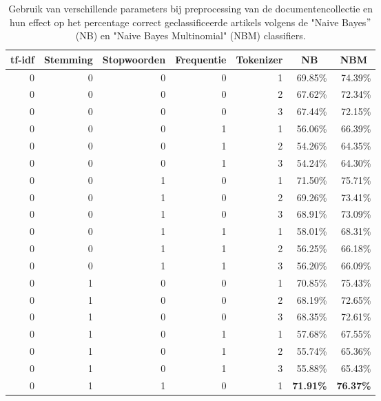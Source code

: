 \newpage
\begin{longtable}{rrrrrrr}
	\caption{Gebruik van verschillende parameters bij preprocessing van de documentencollectie en hun effect op het percentage correct geclassificeerde artikels volgens de "Naive Bayes$"$ (NB) en "Naive Bayes Multinomial" (NBM) classifiers.}\\
	\toprule
	\multicolumn{1}{c}{\textbf{tf-idf}} & \multicolumn{1}{c}{\textbf{Stemming}} & \multicolumn{1}{c}{\textbf{Stopwoorden}} & \multicolumn{1}{c}{\textbf{Frequentie}} & \multicolumn{1}{c}{\textbf{Tokenizer}} & \multicolumn{1}{c}{\textbf{NB}} & \multicolumn{1}{c}{\textbf{NBM}} \\
	\midrule
	0     & 0     & 0     & 0     & 1     & 69.85\% & 74.39\% \\
	0     & 0     & 0     & 0     & 2     & 67.62\% & 72.34\% \\
	0     & 0     & 0     & 0     & 3     & 67.44\% & 72.15\% \\
	0     & 0     & 0     & 1     & 1     & 56.06\% & 66.39\% \\
	0     & 0     & 0     & 1     & 2     & 54.26\% & 64.35\% \\
	0     & 0     & 0     & 1     & 3     & 54.24\% & 64.30\% \\
	0     & 0     & 1     & 0     & 1     & 71.50\% & 75.71\% \\
	0     & 0     & 1     & 0     & 2     & 69.26\% & 73.41\% \\
	0     & 0     & 1     & 0     & 3     & 68.91\% & 73.09\% \\
	0     & 0     & 1     & 1     & 1     & 58.01\% & 68.31\% \\
	0     & 0     & 1     & 1     & 2     & 56.25\% & 66.18\% \\
	0     & 0     & 1     & 1     & 3     & 56.20\% & 66.09\% \\
	0     & 1     & 0     & 0     & 1     & 70.85\% & 75.43\% \\
	0     & 1     & 0     & 0     & 2     & 68.19\% & 72.65\% \\
	0     & 1     & 0     & 0     & 3     & 68.35\% & 72.61\% \\
	0     & 1     & 0     & 1     & 1     & 57.68\% & 67.55\% \\
	0     & 1     & 0     & 1     & 2     & 55.74\% & 65.36\% \\
	0     & 1     & 0     & 1     & 3     & 55.88\% & 65.43\% \\
	0     & 1     & 1     & 0     & 1     & \textbf{71.91\%} & \textbf{76.37\%} \\

\end{longtable}
